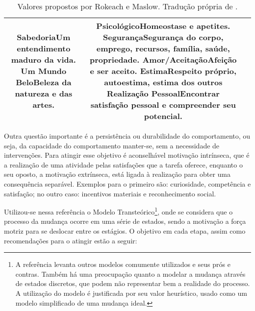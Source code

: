 \begin{table}[h!t]
{\begin{tabular}{ccc}
{\textbf{Sabedoria}\newline Um entendimento maduro da vida. \newline
\textbf{Um Mundo Belo}\newline Beleza da natureza e das artes.
} &
\multicolumn{1}{m{6cm}|}{
\textbf{Psicológico}\newline Homeostase e apetites. \newline
\textbf{Segurança}\newline Segurança do corpo, emprego, recursos, família, saúde,
propriedade. \newline
\textbf{Amor/Aceitação}\newline Afeição e ser aceito. \newline
\textbf{Estima}\newline Respeito próprio, autoestima, estima dos outros \newline
\textbf{Realização Pessoal}\newline Encontrar satisfação pessoal e compreender seu
potencial.
} \\
\hline 
\end{tabular}
}
\caption[Valores propostos por Rokeach e Maslow.]
{Valores propostos por Rokeach e Maslow. Tradução própria de 
\cite[pp. 928]{2010_aspectos_psicologicos_usa}.}
\label{tab:valores}
\end{table}

Outra questão importante é a persistência ou durabilidade do
comportamento, ou seja, da capacidade do comportamento manter-se, sem
a necessidade de intervenções.  Para atingir esse objetivo é
aconselhável motivação intrínseca, que é a realização de uma atividade
pelas satisfações que a tarefa oferece, enquanto o seu oposto, a
motivação extrínseca, está ligada à realização para obter uma
consequência separável. Exemplos para o primeiro são: curiosidade,
competência e satisfação; no outro caso: incentivos materiais e
reconhecimento social.

Utilizou-se nessa referência o Modelo Transteórico\footnote{A referência
levanta outros modelos comumente utilizados e seus prós e contras.
Também há uma preocupação quanto a modelar a mudança através de
estados discretos, que podem não representar bem a realidade do
processo. A utilização do modelo é justificada por seu valor
heurístico, usado como um modelo simplificado de uma mudança ideal.},
onde se considera que o processo da mudança ocorre em uma série de
estados, sendo a motivação a força motriz para se deslocar entre os
estágios. O objetivo em cada etapa, assim como recomendações para o
atingir estão a seguir:

